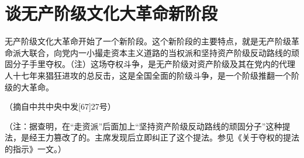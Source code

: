 \section[谈无产阶级文化大革命新阶段（一九六七年一月二十三日）]{谈无产阶级文化大革命新阶段}


无产阶级文化大革命开始了一个新阶段。这个新阶段的主要特点，就是无产阶级革命派大联合，向党内一小撮走资本主义道路的当权派和坚持资产阶级反动路线的顽固分子手里夺权。（注）这场夺权斗争，是无产阶级对资产阶级及其在党内的代理人十七年来猖狂进攻的总反击，这是全国全面的阶级斗争，是一个阶级推翻一个阶级的大革命。

{\raggedleft （摘自中共中央中发[67]27号）\par}

（注：据查明，在“走资派”后面加上“坚持资产阶级反动路线的顽固分子”这种提法，是经王力篡改了的。主席发现后立即纠正了这个提法。参见《关于夺权的提法的指示》一文。）


